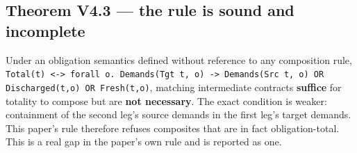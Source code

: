\subsection{Theorem V4.3 --- the rule is sound and incomplete}

Under an obligation semantics defined without reference to any composition rule,
\texttt{Total(t) <-> forall o. Demands(Tgt t, o) -> Demands(Src t, o) OR Discharged(t,o)
OR Fresh(t,o)}, matching intermediate contracts \textbf{suffice} for totality to
compose but are \textbf{not necessary}. The exact condition is weaker: containment of
the second leg's source demands in the first leg's target demands. This paper's rule
therefore refuses composites that are in fact obligation-total. This is a real
gap in the paper's own rule and is reported as one.
